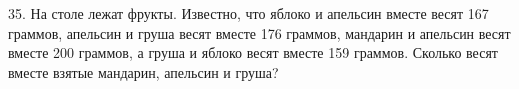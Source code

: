 35. На столе лежат фрукты. Известно, что яблоко и апельсин вместе весят 167 граммов, апельсин и груша весят вместе 176 граммов, мандарин и апельсин весят вместе 200 граммов, а груша и яблоко весят вместе 159 граммов. Сколько весят вместе взятые мандарин, апельсин и груша?\\
